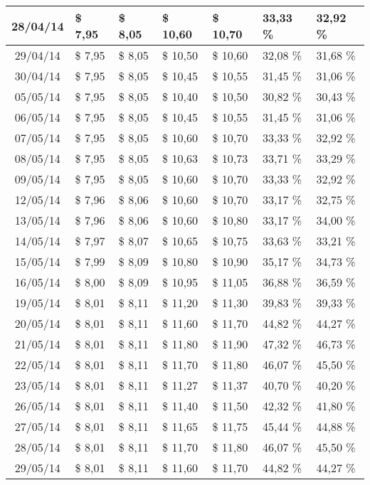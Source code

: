 \begin{center}
\begin{longtable}{|c|p{1.5cm}|p{1.5cm}|p{1.5cm}|p{1.5cm}|p{1.5cm}|p{1.5cm}|}
28/04/14 & \$ 7,95 & \$ 8,05 & \$ 10,60 & \$ 10,70 & 33,33 \% & 32,92 \% \\ \hline
29/04/14 & \$ 7,95 & \$ 8,05 & \$ 10,50 & \$ 10,60 & 32,08 \% & 31,68 \% \\ \hline
30/04/14 & \$ 7,95 & \$ 8,05 & \$ 10,45 & \$ 10,55 & 31,45 \% & 31,06 \% \\ \hline
05/05/14 & \$ 7,95 & \$ 8,05 & \$ 10,40 & \$ 10,50 & 30,82 \% & 30,43 \% \\ \hline
06/05/14 & \$ 7,95 & \$ 8,05 & \$ 10,45 & \$ 10,55 & 31,45 \% & 31,06 \% \\ \hline
07/05/14 & \$ 7,95 & \$ 8,05 & \$ 10,60 & \$ 10,70 & 33,33 \% & 32,92 \% \\ \hline
08/05/14 & \$ 7,95 & \$ 8,05 & \$ 10,63 & \$ 10,73 & 33,71 \% & 33,29 \% \\ \hline
09/05/14 & \$ 7,95 & \$ 8,05 & \$ 10,60 & \$ 10,70 & 33,33 \% & 32,92 \% \\ \hline
12/05/14 & \$ 7,96 & \$ 8,06 & \$ 10,60 & \$ 10,70 & 33,17 \% & 32,75 \% \\ \hline
13/05/14 & \$ 7,96 & \$ 8,06 & \$ 10,60 & \$ 10,80 & 33,17 \% & 34,00 \% \\ \hline
14/05/14 & \$ 7,97 & \$ 8,07 & \$ 10,65 & \$ 10,75 & 33,63 \% & 33,21 \% \\ \hline
15/05/14 & \$ 7,99 & \$ 8,09 & \$ 10,80 & \$ 10,90 & 35,17 \% & 34,73 \% \\ \hline
16/05/14 & \$ 8,00 & \$ 8,09 & \$ 10,95 & \$ 11,05 & 36,88 \% & 36,59 \% \\ \hline
19/05/14 & \$ 8,01 & \$ 8,11 & \$ 11,20 & \$ 11,30 & 39,83 \% & 39,33 \% \\ \hline
20/05/14 & \$ 8,01 & \$ 8,11 & \$ 11,60 & \$ 11,70 & 44,82 \% & 44,27 \% \\ \hline
21/05/14 & \$ 8,01 & \$ 8,11 & \$ 11,80 & \$ 11,90 & 47,32 \% & 46,73 \% \\ \hline
22/05/14 & \$ 8,01 & \$ 8,11 & \$ 11,70 & \$ 11,80 & 46,07 \% & 45,50 \% \\ \hline
23/05/14 & \$ 8,01 & \$ 8,11 & \$ 11,27 & \$ 11,37 & 40,70 \% & 40,20 \% \\ \hline
26/05/14 & \$ 8,01 & \$ 8,11 & \$ 11,40 & \$ 11,50 & 42,32 \% & 41,80 \% \\ \hline
27/05/14 & \$ 8,01 & \$ 8,11 & \$ 11,65 & \$ 11,75 & 45,44 \% & 44,88 \% \\ \hline
28/05/14 & \$ 8,01 & \$ 8,11 & \$ 11,70 & \$ 11,80 & 46,07 \% & 45,50 \% \\ \hline
29/05/14 & \$ 8,01 & \$ 8,11 & \$ 11,60 & \$ 11,70 & 44,82 \% & 44,27 \% \\ \hline

\end{longtable}
\end{center}
